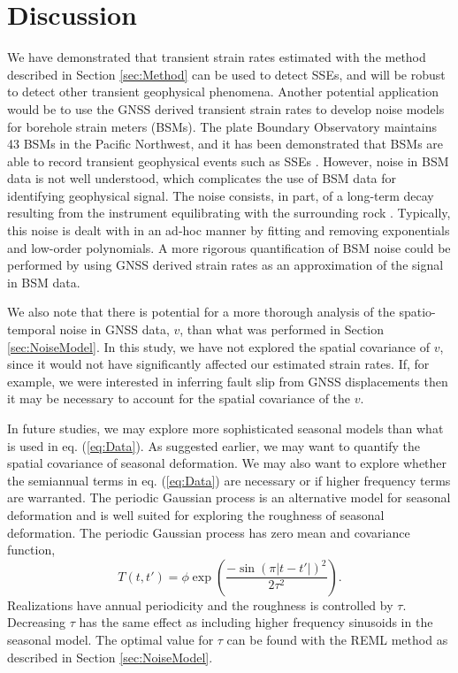 \documentclass[10pt,letter]{article}
\begin{document}
\section{Discussion}\label{sec:Discussion}
We have demonstrated that transient strain rates estimated with the method described in Section \ref{sec:Method} can be used to detect SSEs, and will be robust to detect other transient geophysical phenomena. Another potential application would be to use the GNSS derived transient strain rates to develop noise models for borehole strain meters (BSMs). The plate Boundary Observatory maintains 43 BSMs in the Pacific Northwest, and it has been demonstrated that BSMs are able to record transient geophysical events such as SSEs \citep[e.g.,][]{Dragert2011}. However, noise in BSM data is not well understood, which complicates the use of BSM data for identifying geophysical signal. The noise consists, in part, of a long-term decay resulting from the instrument equilibrating with the surrounding rock \citep{Gladwin1987}. Typically, this noise is dealt with in an ad-hoc manner by fitting and removing exponentials and low-order polynomials. A more rigorous quantification of BSM noise could be performed by using GNSS derived strain rates as an approximation of the signal in BSM data.    

We also note that there is potential for a more thorough analysis of the spatio-temporal noise in GNSS data, $v$, than what was performed in Section \ref{sec:NoiseModel}. In this study, we have not explored the spatial covariance of $v$, since it would not have significantly affected our estimated strain rates. If, for example, we were interested in inferring fault slip from GNSS displacements then it may be necessary to account for the spatial covariance of the $v$.  

In future studies, we may explore more sophisticated seasonal models than what is used in eq. (\ref{eq:Data}). As suggested earlier, we may want to quantify the spatial covariance of seasonal deformation. We may also want to explore whether the semiannual terms in eq. (\ref{eq:Data}) are necessary or if higher frequency terms are warranted.  The periodic Gaussian process \citep{Mackay1998} is an alternative model for seasonal deformation and is well suited for exploring the roughness of seasonal deformation.  The periodic Gaussian process has zero mean and covariance function,
\begin{equation}\label{eq:Periodic}
T(t,t') = \phi \exp\left(\frac{-\sin(\pi|t - t'|)^2}{2\tau^2}\right).
\end{equation}
Realizations have annual periodicity and the roughness is controlled by $\tau$. Decreasing $\tau$ has the same effect as including higher frequency sinusoids in the seasonal model. The optimal value for $\tau$ can be found with the REML method as described in Section \ref{sec:NoiseModel}. 
\end{document}
